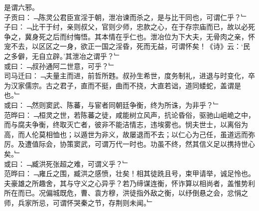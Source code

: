 是谓六邪。
\\
子贡曰：﹁陈灵公君臣宣淫于朝，泄冶谏而杀之，是与比干同也，可谓仁乎？﹂\\
子曰：﹁比干于纣，亲则叔父，官则少师，忠款之心，在于存宗庙而已，故以必死争之，冀身死之后而纣悔悟。其本情在乎仁也。泄冶位为下大夫，无骨肉之亲，怀宠不去，以区区之一身，欲正一国之淫昏，死而无益，可谓怀矣！《诗》云：‘民之多僻，无自立辟。’其泄冶之谓乎？﹂\\
或曰：﹁叔孙通阿二世意，可乎？﹂\\
司马迁曰：﹁夫量主而进，前哲所韪。叔孙生希世，度务制礼，进退与时变化，卒为汉家儒宗。古之君子，直而不挺，曲而不挠，大直若诎，道同蜲蛇，盖谓是也。﹂
\\
或曰：﹁然则窦武、陈蕃，与宦者同朝廷争衡，终为所诛，为非乎？﹂\\
范晔曰：﹁桓灵之世，若陈蕃之徒，咸能树立风声，抗论昏俗，驱驰山岨峗之中，而与腐夫争衡，终取灭亡者，彼非不能洁情志，违埃雾也。悯夫世士，以离俗为高，而人伦莫相恤也；以遁世为非义，故屡退而不去；以仁心为己任，虽道远而弥厉。及遭值际会，协策窦武，可谓万代一时也。功虽不终，然其信义足以携持世心矣。﹂
\\
或曰：﹁臧洪死张超之难，可谓义乎？﹂\\
范晔曰：﹁雍丘之围，臧洪之感愤，壮矣！相其徒跣且号，束甲请举，诚足怜也。夫豪雄之所趣舍，其与守义之心异乎？若乃缔谋连衡，怀诈算以相尚者，盖惟势利所在而已。况偏城既危，曹、袁方穆，洪徒指外敌之衡，以纾倒悬之会，忿悁之师，兵家所忌，可谓怀哭秦之节，存荆则未闻。﹂
